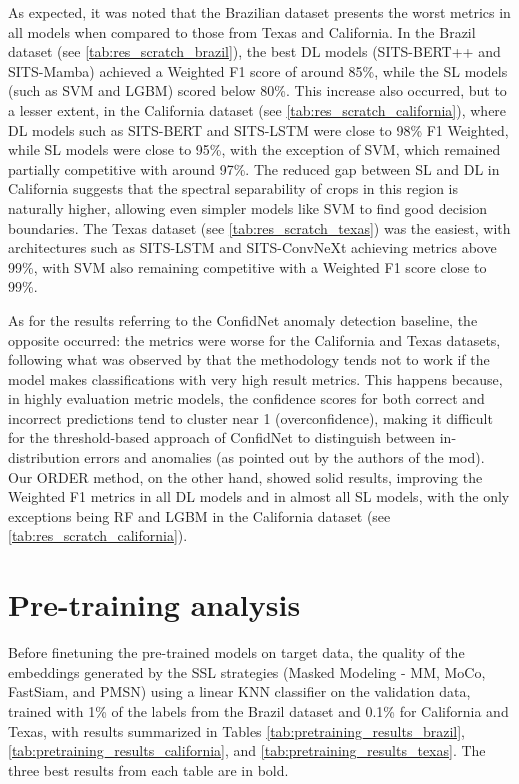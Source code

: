 As expected, it was noted that the Brazilian dataset presents the worst metrics in all models when compared to those from Texas and California. In the Brazil dataset (see \autoref{tab:res_scratch_brazil}), the best \ac{DL} models (SITS-BERT++ and SITS-Mamba) achieved a Weighted F1 score of around 85\%, while the \ac{SL} models (such as SVM and LGBM) scored below 80\%. This increase also occurred, but to a lesser extent, in the California dataset (see \autoref{tab:res_scratch_california}), where \ac{DL} models such as SITS-BERT and SITS-LSTM were close to 98\% F1 Weighted, while \ac{SL} models were close to 95\%, with the exception of \ac{SVM}, which remained partially competitive with around 97\%. The reduced gap between SL and DL in California suggests that the spectral separability of crops in this region is naturally higher, allowing even simpler models like \ac{SVM} to find good decision boundaries. The Texas dataset (see \autoref{tab:res_scratch_texas}) was the easiest, with architectures such as SITS-LSTM and SITS-ConvNeXt achieving metrics above 99\%, with \ac{SVM} also remaining competitive with a Weighted F1 score close to 99\%. 

As for the results referring to the ConfidNet anomaly detection baseline, the opposite occurred: the metrics were worse for the California and Texas datasets, following what was observed by \cite{cheng2019leveraging} that the methodology tends not to work if the model makes classifications with very high result metrics. This happens because, in highly evaluation metric models, the confidence scores for both correct and incorrect predictions tend to cluster near 1 (overconfidence), making it difficult for the threshold-based approach of ConfidNet to distinguish between in-distribution errors and anomalies (as pointed out by the authors of the mod). Our ORDER method, on the other hand, showed solid results, improving the Weighted F1 metrics in all \ac{DL} models and in almost all \ac{SL} models, with the only exceptions being \ac{RF} and \ac{LGBM} in the California dataset (see \autoref{tab:res_scratch_california}).

\section{Pre-training analysis}

Before finetuning the pre-trained models on target data, the quality of the embeddings generated by the SSL strategies (Masked Modeling - MM, MoCo, FastSiam, and PMSN) using a linear KNN classifier on the validation data, trained with 1\% of the labels from the Brazil dataset and 0.1\% for California and Texas, with results summarized in Tables \ref{tab:pretraining_results_brazil}, \ref{tab:pretraining_results_california}, and \ref{tab:pretraining_results_texas}. The three best results from each table are in bold.

